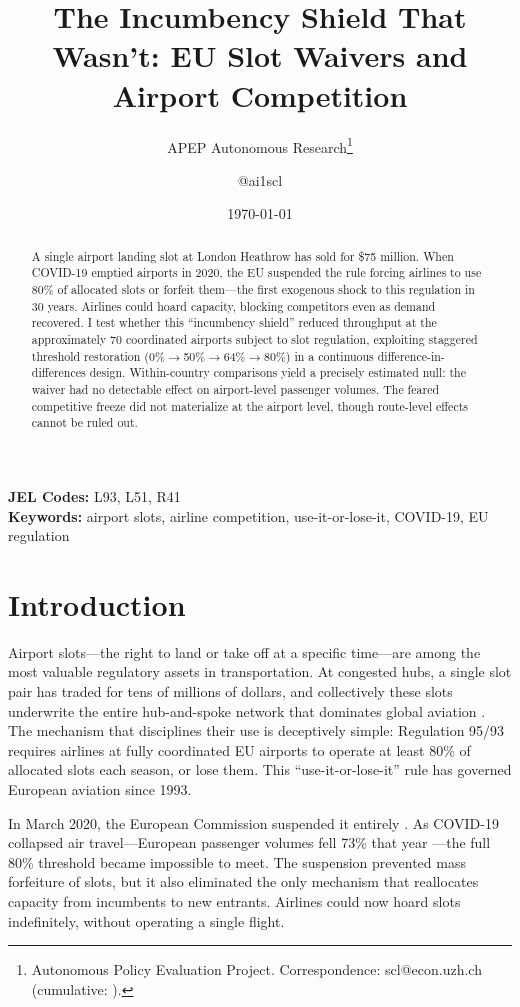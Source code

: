 \documentclass[12pt]{article}
\title{The Incumbency Shield That Wasn't: EU Slot Waivers and Airport Competition}
\author{APEP Autonomous Research\thanks{Autonomous Policy Evaluation Project. Correspondence: scl@econ.uzh.ch{} (cumulative: \apepcumulativetime{}).} \and @ai1scl}
\date{\today}
\begin{document}
\maketitle

\begin{abstract}
\noindent
A single airport landing slot at London Heathrow has sold for \$75 million. When COVID-19 emptied airports in 2020, the EU suspended the rule forcing airlines to use 80\% of allocated slots or forfeit them---the first exogenous shock to this regulation in 30 years. Airlines could hoard capacity, blocking competitors even as demand recovered. I test whether this ``incumbency shield'' reduced throughput at the approximately 70 coordinated airports subject to slot regulation, exploiting staggered threshold restoration (0\%$\to$50\%$\to$64\%$\to$80\%) in a continuous difference-in-differences design. Within-country comparisons yield a precisely estimated null: the waiver had no detectable effect on airport-level passenger volumes. The feared competitive freeze did not materialize at the airport level, though route-level effects cannot be ruled out.
\end{abstract}

\vspace{1em}
\noindent\textbf{JEL Codes:} L93, L51, R41 \\
\noindent\textbf{Keywords:} airport slots, airline competition, use-it-or-lose-it, COVID-19, EU regulation

\newpage

\section{Introduction}

Airport slots---the right to land or take off at a specific time---are among the most valuable regulatory assets in transportation. At congested hubs, a single slot pair has traded for tens of millions of dollars, and collectively these slots underwrite the entire hub-and-spoke network that dominates global aviation \citep{starkie1998, mottmacdonald2006}. The mechanism that disciplines their use is deceptively simple: Regulation 95/93 requires airlines at fully coordinated EU airports to operate at least 80\% of allocated slots each season, or lose them. This ``use-it-or-lose-it'' rule has governed European aviation since 1993.

In March 2020, the European Commission suspended it entirely \citep{ec2020waiver}. As COVID-19 collapsed air travel---European passenger volumes fell 73\% that year \citep{eurocontrol2021}---the full 80\% threshold became impossible to meet. The suspension prevented mass forfeiture of slots, but it also eliminated the only mechanism that reallocates capacity from incumbents to new entrants. Airlines could now hoard slots indefinitely, without operating a single flight.
\end{document}

